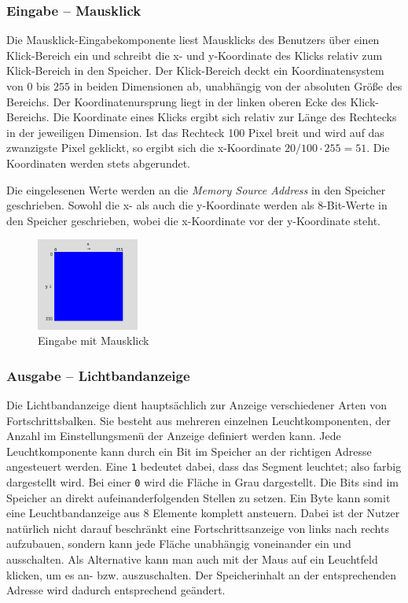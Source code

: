\subsubsection{Eingabe -- Mausklick}
Die Mausklick-Eingabekomponente liest Mausklicks des Benutzers über einen
Klick-Bereich ein und schreibt die x- und y-Koordinate des Klicks relativ zum
Klick-Bereich in den Speicher. Der Klick-Bereich deckt ein Koordinatensystem von
$0$ bis $255$ in beiden Dimensionen ab, unabhängig von der absoluten Größe des
Bereichs. Der Koordinatenursprung liegt in der linken oberen Ecke des
Klick-Bereichs. Die Koordinate eines Klicks ergibt sich relativ zur Länge des
Rechtecks in der jeweiligen Dimension. Ist das Rechteck 100 Pixel breit und wird
auf das zwanzigste Pixel geklickt, so ergibt sich die x-Koordinate $20 / 100
\cdot 255 = 51$. Die Koordinaten werden stets abgerundet.

Die eingelesenen Werte werden an die \textit{Memory Source Address} in
den Speicher geschrieben. Sowohl die x- als auch die y-Koordinate werden als
8-Bit-Werte in den Speicher geschrieben, wobei die x-Koordinate vor der
y-Koordinate steht.

\begin{figure}[ht]
	\centering
	\includegraphics[width=0.3\textwidth]{Images/MouseArea}
	\caption{Eingabe mit Mausklick}
	\label{MouseArea}
\end{figure}

\subsubsection{Ausgabe -- Lichtbandanzeige}

Die Lichtbandanzeige dient hauptsächlich zur Anzeige verschiedener Arten von
Fortschrittsbalken. Sie besteht aus mehreren einzelnen Leuchtkomponenten, der
Anzahl im Einstellungsmenü der Anzeige definiert werden kann. Jede
Leuchtkomponente kann durch ein Bit im Speicher an der richtigen Adresse
angesteuert werden. Eine \texttt{1} bedeutet dabei, dass das Segment leuchtet;
also farbig dargestellt wird. Bei einer \texttt{0} wird die Fläche in Grau
dargestellt. Die Bits sind im Speicher an direkt aufeinanderfolgenden Stellen zu
setzen. Ein Byte kann somit eine Leuchtbandanzeige aus 8 Elemente komplett
ansteuern. Dabei ist der Nutzer natürlich nicht darauf beschränkt eine
Fortschrittsanzeige von links nach rechts aufzubauen, sondern kann jede Fläche
unabhängig voneinander ein und ausschalten. Als Alternative kann man auch mit
der Maus auf ein Leuchtfeld klicken, um es an- bzw. auszuschalten. Der
Speicherinhalt an der entsprechenden Adresse wird dadurch entsprechend
geändert.\\


